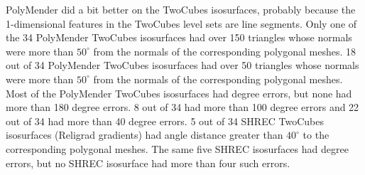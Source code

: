 PolyMender did a bit better on the TwoCubes isosurfaces,
probably because the 1-dimensional features in the TwoCubes level sets are line segments.
Only one of the 34 PolyMender TwoCubes isosurfaces had over 150 triangles
whose normals were more than $50^\circ$ from the normals of the corresponding polygonal meshes.
18 out of 34 PolyMender TwoCubes isosurfaces had over 50 triangles
whose normals were more than $50^\circ$ from the normals of the corresponding polygonal meshes.
Most of the PolyMender TwoCubes isosurfaces had degree errors,
but none had more than 180 degree errors.
8 out of 34 had more than 100 degree errors
and 22 out of 34 had more than 40 degree errors.
5 out of 34 SHREC TwoCubes isosurfaces (Religrad gradients)
had angle distance greater than $40^\circ$ to the corresponding polygonal meshes.
The same five SHREC isosurfaces had degree errors,
but no SHREC isosurface had more than four such errors.

